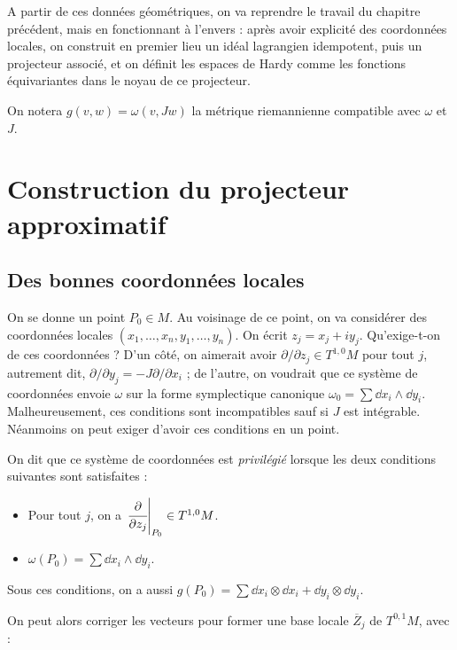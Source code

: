 A partir de ces données géométriques, on va reprendre le travail du chapitre précédent, mais en fonctionnant à l'envers : après avoir explicité des coordonnées locales, on construit en premier lieu un idéal lagrangien idempotent, puis un projecteur associé, et on définit les espaces de Hardy comme les fonctions équivariantes dans le noyau de ce projecteur.

On notera $g(v,w)=\omega(v,Jw)$ la métrique riemannienne compatible avec $\omega$ et $J$.

\section{Construction du projecteur approximatif}

\subsection{Des bonnes coordonnées locales}

On se donne un point $P_0 \in M$. Au voisinage de ce point, on va considérer des coordonnées locales $(x_1,\ldots, x_n,y_1,\ldots, y_n)$. On écrit $z_j=x_j+iy_j$. Qu'exige-t-on de ces coordonnées ? D'un côté, on aimerait avoir $\partial/\partial z_j \in T^{1,0}M$ pour tout $j$, autrement dit, $\partial/\partial y_j = -J\partial/\partial x_i$ ; de l'autre, on voudrait que ce système de coordonnées envoie $\omega$ sur la forme symplectique canonique $\omega_0 = \sum \dd x_i \wedge \dd y_i$. Malheureusement, ces conditions sont incompatibles sauf si $J$ est intégrable. Néanmoins on peut exiger d'avoir ces conditions en un point.

\begin{defn}
	On dit que ce système de coordonnées est \emph{privilégié} lorsque les deux conditions suivantes sont satisfaites :
	\begin{itemize}
		\item Pour tout $j$, on a $\left.\cfrac{\partial}{\partial z_j}\right|_{P_0} \in T^{1,0}M$.
		\item $\omega(P_0)=\sum \dd x_i \wedge \dd y_i$.
	\end{itemize}
\end{defn}

\begin{rem}
	Sous ces conditions, on a aussi $g(P_0) = \sum \dd x_i \otimes \dd x_i + \dd y_i \otimes \dd y_i$.
\end{rem}

On peut alors corriger les vecteurs pour former une base locale $\overline{Z}_j$ de $T^{0,1}M$, avec :

